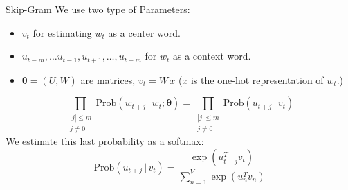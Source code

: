 \documentclass[handout]{beamer}
\newcommand{\Prob}{\text{Prob}}
\newcommand{\btheta}{\pmb{\theta}}
\newcommand{\given}{\, | \,}
\begin{document}
\begin{frame}{Skip-Gram }
    We use two type of Parameters:
    \begin{itemize}
            \item $v_t$ for estimating $w_t$ as a center word.
            \item $u_{t-m}, \ldots u_{t-1}, u_{t+1}, \ldots , u_{t+m}$ for $w_t$ as a context word.
            \item $\btheta = (U,W)$ are matrices, $v_t = W\, x$ ($x$ is the one-hot representation of $w_t$.)
    \end{itemize}
    $$\prod_{\substack{|j|\leq m\\ j\neq 0}}\Prob(w_{t+j}\given w_t; \btheta) =    \prod_{\substack{|j|\leq m\\ j\neq 0} } \Prob(u_{t+j} \given v_t)$$
    We estimate this last probability as a softmax:
    $$\Prob(u_{t+j}\given v_t) = \frac{\exp(u^T_{t+j}v_t)}{ \sum_{n=1}^V \exp(u_n^T v_n)}$$
\end{frame}
\end{document}
